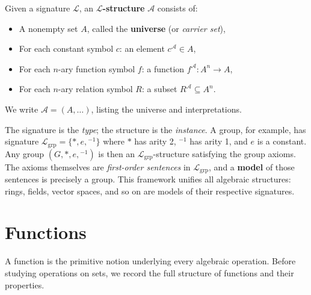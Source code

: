 \begin{definition}
\label{def:formal-model-theoretic-structures-l62}
  Given a signature $\mathcal{L}$, an \textbf{$\mathcal{L}$-structure}
  $\mathcal{A}$ consists of:
  \begin{itemize}
    \item A nonempty set $A$, called the \textbf{universe} (or
          \emph{carrier set}),
    \item For each constant symbol $c$: an element $c^{\mathcal{A}} \in A$,
    \item For each $n$-ary function symbol $f$: a function
          $f^{\mathcal{A}} : A^n \to A$,
    \item For each $n$-ary relation symbol $R$: a subset
          $R^{\mathcal{A}} \subseteq A^n$.
  \end{itemize}
  We write $\mathcal{A} = (A, \ldots)$, listing the universe and
  interpretations.
\end{definition}

\begin{remark}
  The signature is the \emph{type}; the structure is the \emph{instance}.
  A group, for example, has signature
  $\mathcal{L}_{\mathrm{grp}} = \{*, e, {}^{-1}\}$
  where $*$ has arity 2, ${}^{-1}$ has arity 1, and $e$ is a constant.
  Any group $(G, *, e, {}^{-1})$ is then an $\mathcal{L}_{\mathrm{grp}}$-structure
  satisfying the group axioms.  The axioms themselves are
  \emph{first-order sentences} in $\mathcal{L}_{\mathrm{grp}}$, and a
  \textbf{model} of those sentences is precisely a group.
  This framework unifies all algebraic structures: rings, fields, vector
  spaces, and so on are models of their respective signatures.
\end{remark}

\medskip

\section*{Functions}

\noindent
A function is the primitive notion underlying every algebraic operation.
Before studying operations on sets, we record the full structure of
functions and their properties.

